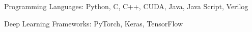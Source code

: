 

\begin{cventries}

\vspace{5mm}

  \begin{cvitems} %
    \item {Programming Languages: Python, C, C++, CUDA, Java, Java Script, Verilog}
    \item {Deep Learning Frameworks: PyTorch, Keras, TensorFlow}
   \end{cvitems}
    
\end{cventries}

